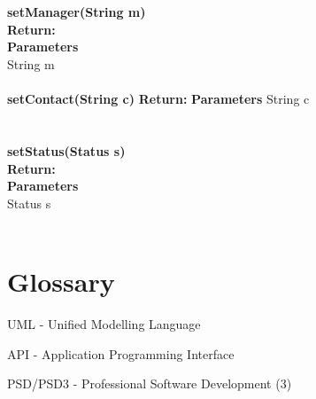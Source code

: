 \documentclass{l3deliverable}
\begin{document}
\\
\\
\textbf{setManager(String m)}\\
\textbf{Return:}\\
\textbf{Parameters}\\
String m
\\
\\
\textbf{setContact(String c)}
\textbf{Return:}
\textbf{Parameters}
String c\\
\\
\\
\textbf{setStatus(Status s)}\\
\textbf{Return:}\\
\textbf{Parameters}\\
Status s\\
\\

\appendix

\section{Glossary}
\item{UML - Unified Modelling Language}
\item{API - Application Programming Interface}
\item{PSD/PSD3 - Professional Software Development (3)}
\end{document}
